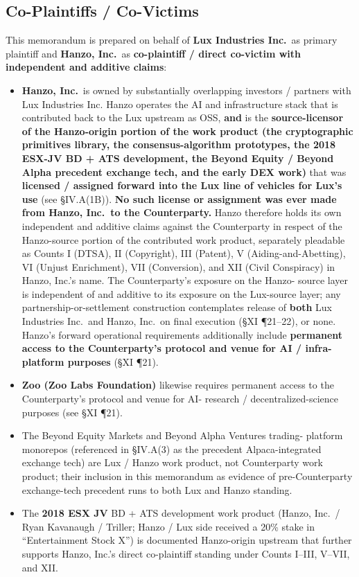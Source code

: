 \documentclass[11pt,letterpaper]{article}
\begin{document}
\subsection*{Co-Plaintiffs / Co-Victims}

This memorandum is prepared on behalf of \textbf{Lux Industries Inc.}\
as primary plaintiff and \textbf{Hanzo, Inc.}\ as
\textbf{co-plaintiff / direct co-victim with independent and additive
claims}:

\begin{itemize}[leftmargin=1.5em,itemsep=0.1em]
\item \textbf{Hanzo, Inc.}\ is owned by substantially overlapping
investors / partners with Lux Industries Inc. Hanzo operates the
AI and infrastructure stack that is contributed back to the Lux
upstream as OSS, \textbf{and} is the \textbf{source-licensor of the
Hanzo-origin portion of the work product (the cryptographic
primitives library, the consensus-algorithm prototypes, the 2018
ESX-JV BD + ATS development, the Beyond Equity / Beyond Alpha
precedent exchange tech, and the early DEX work)} that was
\textbf{licensed / assigned forward into the Lux line of vehicles
for Lux's use} (see \S IV.A(1B)). \textbf{No such license or
assignment was ever made from Hanzo, Inc.\ to the Counterparty.}
Hanzo therefore holds its own independent and additive claims
against the Counterparty in respect of the Hanzo-source portion of
the contributed work product, separately pleadable as Counts I
(DTSA), II (Copyright), III (Patent), V (Aiding-and-Abetting), VI
(Unjust Enrichment), VII (Conversion), and XII (Civil Conspiracy)
in Hanzo, Inc.'s name. The Counterparty's exposure on the Hanzo-
source layer is independent of and additive to its exposure on the
Lux-source layer; any partnership-or-settlement construction
contemplates release of \textbf{both} Lux Industries Inc.\ and
Hanzo, Inc.\ on final execution (\S XI ¶21--22), or none.
Hanzo's forward operational requirements additionally include
\textbf{permanent access to the Counterparty's protocol and venue
for AI / infra-platform purposes} (\S XI ¶21).
\item \textbf{Zoo (Zoo Labs Foundation)} likewise requires
permanent access to the Counterparty's protocol and venue for AI-
research / decentralized-science purposes (see \S XI ¶21).
\item The Beyond Equity Markets and Beyond Alpha Ventures trading-
platform monorepos (referenced in \S IV.A(3) as the precedent
Alpaca-integrated exchange tech) are Lux / Hanzo work product,
not Counterparty work product; their inclusion in this memorandum
as evidence of pre-Counterparty exchange-tech precedent runs to
both Lux and Hanzo standing.
\item The \textbf{2018 ESX JV} BD + ATS development work product
(Hanzo, Inc.\ / Ryan Kavanaugh / Triller; Hanzo / Lux side received
a 20\% stake in ``Entertainment Stock X'') is documented Hanzo-origin
upstream that further supports Hanzo, Inc.'s direct co-plaintiff
standing under Counts I--III, V--VII, and XII.
\end{itemize}
\end{document}
